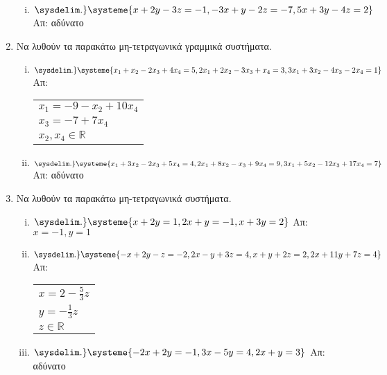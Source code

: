 \begin{enumerate}
\begin{enumerate}[i)]
    \item $ 
    \sysdelim.\}
    \systeme{
        x+2y-3z=-1,
        -3x+y-2z=-7,
        5x+3y-4z=2
    } $ 
    \hfill Απ: αδύνατο 
\end{enumerate}

\item Να λυθούν τα παρακάτω μη-τετραγωνικά γραμμικά συστήματα.

    \begin{enumerate}[i)]

        \item $ 
        \sysdelim.\}
        \systeme{
            x_{1}+ x_{2}-2 x_{3}+4 x_{4}=5,
            2 x_{1}+ 2 x_{2}-3 x_{3}+ x_{4}=3, 
            3 x_{1}+3 x_{2}-4 x_{3}-2 x_{4}=1
        } $ 
        \hfill Απ: \begin{tabular}{l}
            $ x_{1}=-9- x_{2}+10 x_{4} $ \\
            $ x_{3}= -7+7 x_{4} $ \\ 
            $ x_{2}, x_{4} \in \mathbb{R} $  
        \end{tabular}

    \item $ 
    \sysdelim.\}
    \systeme{
        x_{1}+3 x_{2}-2 x_{3}+5 x_{4}=4,
        2 x_{1}+8 x_{2}- x_{3}+9 x_{4}=9,
        3 x_{1}+5 x_{2}-12 x_{3}+17 x_{4}=7
    } $ 
    \hfill Απ: αδύνατο 
    \end{enumerate}

\item Να λυθούν τα παρακάτω μη-τετραγωνικά συστήματα.

    \begin{enumerate}[i)]
        \item $ 
        \sysdelim.\}
        \systeme{
            x+2y=1,
            2x+y=-1,
            x+3 y=2 
        } $ 
        \hfill Απ: $ x=-1, y=1 $ 

    \item $ 
    \sysdelim.\}
    \systeme{
        -x+2 y-z=-2,
        2x-y+3z=4,
        x+y+2z=2,
        2x+11y+7z=4
    } $ 
    \hfill Απ:\begin{tabular}{l} 
        $ x=2- \frac{5}{3} z $ \\ 
        $ y = - \frac{1}{3} z $ \\ 
        $ z \in \mathbb{R} $
    \end{tabular}

\item $ 
\sysdelim.\}
\systeme{
    -2x+2y=-1,
    3x-5y=4,
    2x+y=3
} $ 
\hfill Απ: αδύνατο 

    \end{enumerate}

\end{enumerate}



